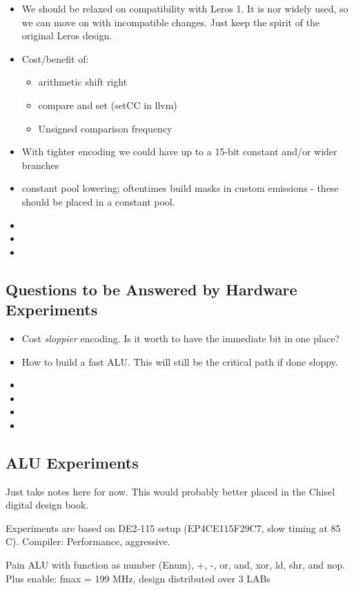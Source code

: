 \documentclass[a4paper,fontsize=10pt,twoside,DIV15,BCOR12mm,headinclude=true,footinclude=false,pagesize,bibtotoc]{scrbook}
\begin{document}
\begin{itemize}
\item We should be relaxed on compatibility with Leros 1. It is nor widely used, so we can move on
with incompatible changes. Just keep the spirit of the original Leros design.
\item Cost/benefit of: 
\begin{itemize}
    \item arithmetic shift right
    \item compare and set (setCC in llvm)
    \item Unsigned comparison frequency
\end{itemize}
\item With tighter encoding we could have up to a 15-bit constant and/or wider branches
\item constant pool lowering; oftentimes build masks in custom emissions - these should be placed in a constant pool.
\item 
\item 
\item 
\end{itemize}

\subsection{Questions to be Answered by Hardware Experiments}

\begin{itemize}
\item Cost \emph{sloppier} encoding. Is it worth to have the immediate bit in one place?
\item How to build a fast ALU. This will still be the critical path if done sloppy.
\item 
\item 
\item 
\item 
\end{itemize}

\subsection{ALU Experiments}

Just take notes here for now. This would probably better placed in the Chisel digital design
book.

Experiments are based on DE2-115 setup (EP4CE115F29C7, slow timing at 85 C).
Compiler: Performance, aggressive.

Pain ALU with function as number (Enum), +, -, or, and, xor, ld, shr, and nop. Plus enable:
fmax = 199 MHz, design distributed over 3 LABs
\end{document}
